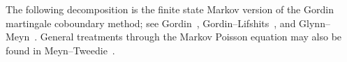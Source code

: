 \documentclass[11pt,a4paper]{amsart}
\theoremstyle{definition}
\theoremstyle{remark}
\numberwithin{equation}{section}
\newcommand{\EE}{\mathbb E}
\newcommand{\1}{\boldsymbol 1}
\begin{document}
The following decomposition is the finite state Markov version of the
Gordin martingale coboundary method; see Gordin~\cite{Gordin1969},
Gordin--Lifshits~\cite{GordinLifshits1978}, and
Glynn--Meyn~\cite{GlynnMeyn1996}.  General treatments through the
Markov Poisson equation may also be found in
Meyn--Tweedie~\cite[Chapter~17]{MeynTweedie}.
%
%
\end{document}
